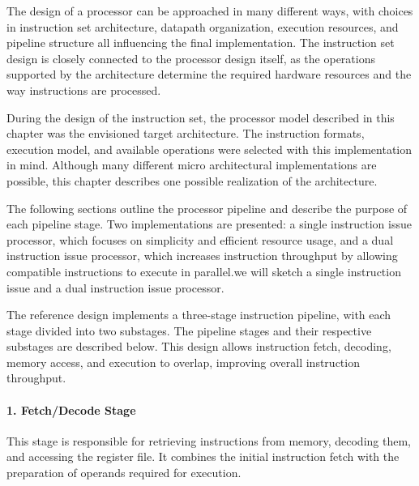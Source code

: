 
The design of a processor can be approached in many different ways, with choices in instruction set architecture, datapath organization, execution resources, and pipeline structure all influencing the final implementation. The instruction set design is closely connected to the processor design itself, as the operations supported by the architecture determine the required hardware resources and the way instructions are processed.

During the design of the instruction set, the processor model described in this chapter was the envisioned target architecture. The instruction formats, execution model, and available operations were selected with this implementation in mind. Although many different micro architectural implementations are possible, this chapter describes one possible realization of the architecture.

The following sections outline the processor pipeline and describe the purpose of each pipeline stage. Two implementations are presented: a single instruction issue processor, which focuses on simplicity and efficient resource usage, and a dual instruction issue processor, which increases instruction throughput by allowing compatible instructions to execute in parallel.we will sketch a single instruction issue and a dual instruction issue processor.



The reference design implements a three-stage instruction pipeline, with each stage divided into two substages. The pipeline stages and their respective substages are described below. This design allows instruction fetch, decoding, memory access, and execution to overlap, improving overall instruction throughput.

\paragraph{1. Fetch/Decode Stage}
This stage is responsible for retrieving instructions from memory, decoding them, and accessing the register file. It combines the initial instruction fetch with the preparation of operands required for execution.

